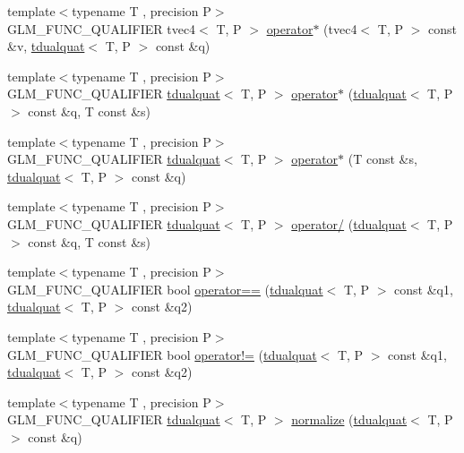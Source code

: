 \begin{DoxyCompactItemize}
{\footnotesize template$<$typename T , precision P$>$ }\\G\+L\+M\+\_\+\+F\+U\+N\+C\+\_\+\+Q\+U\+A\+L\+I\+F\+I\+E\+R tvec4$<$ T, P $>$ \hyperlink{namespaceglm_a7b2a46a8862527e45c3d7bd3fdfcfa10}{operator$\ast$} (tvec4$<$ T, P $>$ const \&v, \hyperlink{structglm_1_1tdualquat}{tdualquat}$<$ T, P $>$ const \&q)
\item 
{\footnotesize template$<$typename T , precision P$>$ }\\G\+L\+M\+\_\+\+F\+U\+N\+C\+\_\+\+Q\+U\+A\+L\+I\+F\+I\+E\+R \hyperlink{structglm_1_1tdualquat}{tdualquat}$<$ T, P $>$ \hyperlink{group__gtx__dual__quaternion_ga5251d67271c42cf52227b6254f3fc8ed}{operator$\ast$} (\hyperlink{structglm_1_1tdualquat}{tdualquat}$<$ T, P $>$ const \&q, T const \&s)
\item 
{\footnotesize template$<$typename T , precision P$>$ }\\G\+L\+M\+\_\+\+F\+U\+N\+C\+\_\+\+Q\+U\+A\+L\+I\+F\+I\+E\+R \hyperlink{structglm_1_1tdualquat}{tdualquat}$<$ T, P $>$ \hyperlink{group__gtx__dual__quaternion_ga0aedf77f3e7d45464501570c28df0ed7}{operator$\ast$} (T const \&s, \hyperlink{structglm_1_1tdualquat}{tdualquat}$<$ T, P $>$ const \&q)
\item 
{\footnotesize template$<$typename T , precision P$>$ }\\G\+L\+M\+\_\+\+F\+U\+N\+C\+\_\+\+Q\+U\+A\+L\+I\+F\+I\+E\+R \hyperlink{structglm_1_1tdualquat}{tdualquat}$<$ T, P $>$ \hyperlink{group__gtx__dual__quaternion_gad27b1d064624dd6ff1ecc205616323ba}{operator/} (\hyperlink{structglm_1_1tdualquat}{tdualquat}$<$ T, P $>$ const \&q, T const \&s)
\item 
{\footnotesize template$<$typename T , precision P$>$ }\\G\+L\+M\+\_\+\+F\+U\+N\+C\+\_\+\+Q\+U\+A\+L\+I\+F\+I\+E\+R bool \hyperlink{namespaceglm_aad95e2ae87bce8bf591ce20fc6997f49}{operator==} (\hyperlink{structglm_1_1tdualquat}{tdualquat}$<$ T, P $>$ const \&q1, \hyperlink{structglm_1_1tdualquat}{tdualquat}$<$ T, P $>$ const \&q2)
\item 
{\footnotesize template$<$typename T , precision P$>$ }\\G\+L\+M\+\_\+\+F\+U\+N\+C\+\_\+\+Q\+U\+A\+L\+I\+F\+I\+E\+R bool \hyperlink{namespaceglm_a7720bbb7f60c8f0780ddd38e2f651331}{operator!=} (\hyperlink{structglm_1_1tdualquat}{tdualquat}$<$ T, P $>$ const \&q1, \hyperlink{structglm_1_1tdualquat}{tdualquat}$<$ T, P $>$ const \&q2)
\item 
{\footnotesize template$<$typename T , precision P$>$ }\\G\+L\+M\+\_\+\+F\+U\+N\+C\+\_\+\+Q\+U\+A\+L\+I\+F\+I\+E\+R \hyperlink{structglm_1_1tdualquat}{tdualquat}$<$ T, P $>$ \hyperlink{group__gtx__dual__quaternion_ga495818aa48c23e9e730f87a3c337d1d5}{normalize} (\hyperlink{structglm_1_1tdualquat}{tdualquat}$<$ T, P $>$ const \&q)

\end{DoxyCompactItemize}
